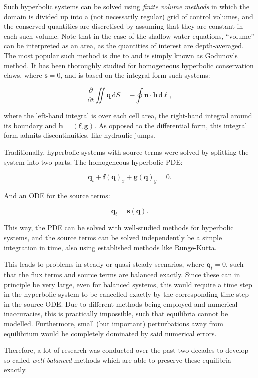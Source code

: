 \documentclass[a4paper,onecolumn,11pt]{article}
\renewcommand{\vec}[1]{\ensuremath{\mathbf{#1}}}
\newcommand{\dif}{\mathrm{d}}
\begin{document}
\begin{assignment}
Such hyperbolic systems can be solved using \emph{finite volume methods} in which the domain is divided up into a (not necessarily regular) grid of control volumes, and the conserved quantities are discretised by assuming that they are constant in each such volume. Note that in the case of the shallow water equations, ``volume'' can be interpreted as an area, as the quantities of interest are depth-averaged. The most popular such method is due to \citet{godunov1959difference} and is simply known as Godunov's method. It has been thoroughly studied for homogeneous hyperbolic conservation claws, where $\vec{s} = 0$, and is based on the integral form such systems:

$$
    \frac{\partial}{\partial t} \iint \vec{q}\,\dif S = - \oint \vec{n} \cdot \vec{h}\,\dif \ell,
$$

where the left-hand integral is over each cell area, the right-hand integral around its boundary and $\vec{h} = (\vec{f}, \vec{g})$. As opposed to the differential form, this integral form admits discontinuities, like hydraulic jumps.

Traditionally, hyperbolic systems with source terms were solved by splitting the system into two parts. The homogeneous hyperbolic PDE:

$$
    \vec{q}_t + \vec{f}(\vec{q})_x + \vec{g}(\vec{q})_y = 0.
$$

And an ODE for the source terms:

$$
    \vec{q}_t = \vec{s}(\vec{q}).
$$

This way, the PDE can be solved with well-studied methods for hyperbolic systems, and the source terms can be solved independently be a simple integration in time, also using established methods like Runge-Kutta.

This leads to problems in steady or quasi-steady scenarios, where $\vec{q}_t = 0$, such that the flux terms and source terms are balanced exactly. Since these can in principle be very large, even for balanced systems, this would require a time step in the hyperbolic system to be cancelled exactly by the corresponding time step in the source ODE. Due to different methods being employed and numerical inaccuracies, this is practically impossible, such that equilibria cannot be modelled. Furthermore, small (but important) perturbations away from equilibrium would be completely dominated by said numerical errors.

Therefore, a lot of research was conducted over the past two decades to develop so-called \emph{well-balanced} methods which are able to preserve these equilibria exactly.


\end{assignment}
\end{document}
